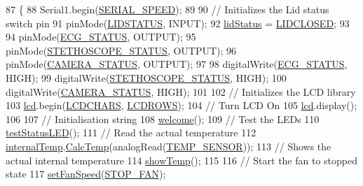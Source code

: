 \begin{DoxyCode}
87              \{
88   Serial1.begin(\hyperlink{_globals_8h_a4081bc1d938e0d9b2b0941e3a1143498}{SERIAL\_SPEED});
89 
90   \textcolor{comment}{// Initializes the Lid status switch pin}
91   pinMode(\hyperlink{_globals_8h_a9d1e04090b98f20c171c70e566a32e16}{LIDSTATUS}, INPUT);
92   \hyperlink{_meditech___chip_kit_control_panel_8pde_adea51712174a5f82a31231a67e0d4608}{lidStatus} = \hyperlink{_globals_8h_af04a3919dc1fa7d521c9514be995b43d}{LIDCLOSED};
93   
94   pinMode(\hyperlink{_globals_8h_a81c971d1ee27ca31e310c80ef260b390}{ECG\_STATUS}, OUTPUT);
95   pinMode(\hyperlink{_globals_8h_a8519a074bf27b6dcc876ce549b2f5ea7}{STETHOSCOPE\_STATUS}, OUTPUT);
96   pinMode(\hyperlink{_globals_8h_ad0154ccab9906702a495f07dfedd0136}{CAMERA\_STATUS}, OUTPUT);
97 
98   digitalWrite(\hyperlink{_globals_8h_a81c971d1ee27ca31e310c80ef260b390}{ECG\_STATUS}, HIGH);
99   digitalWrite(\hyperlink{_globals_8h_a8519a074bf27b6dcc876ce549b2f5ea7}{STETHOSCOPE\_STATUS}, HIGH);
100   digitalWrite(\hyperlink{_globals_8h_ad0154ccab9906702a495f07dfedd0136}{CAMERA\_STATUS}, HIGH);
101 
102   \textcolor{comment}{// Initializes the LCD library}
103   \hyperlink{_meditech___chip_kit_control_panel_8pde_ae0b100905fb0ed88dddaafda0aa05379}{lcd}.begin(\hyperlink{_l_c_d_8h_acea744bc7db589514d98dde1a19a4be6}{LCDCHARS}, \hyperlink{_l_c_d_8h_a1b8861bc5ab0412d754e0bd902c73bcf}{LCDROWS});
104   \textcolor{comment}{// Turn LCD On}
105   \hyperlink{_meditech___chip_kit_control_panel_8pde_ae0b100905fb0ed88dddaafda0aa05379}{lcd}.display();
106 
107   \textcolor{comment}{// Initialisation string}
108   \hyperlink{_meditech___chip_kit_control_panel_8pde_a236e454e493fc9b262f746305660a2eb}{welcome}();
109   \textcolor{comment}{// Test the LEDs}
110   \hyperlink{_meditech___chip_kit_control_panel_8pde_af1a6bbf84a5ea76623bdc49aaf642a28}{testStatusLED}();
111   \textcolor{comment}{// Read the actual temperature}
112   \hyperlink{_meditech___chip_kit_control_panel_8pde_adcfca3504612462229db71750def77f9}{internalTemp}.\hyperlink{class_temperature_a909c328fd6235d0e7c8ea110a1fb201d}{CalcTemp}(analogRead(\hyperlink{_temperature_8h_a16433c75f0d3615fe60d59ec8a86834a}{TEMP\_SENSOR}));
113   \textcolor{comment}{// Shows the actual internal temperature}
114   \hyperlink{_meditech___chip_kit_control_panel_8pde_a89c0a8283a410b693ebef39173a8f493}{showTemp}();
115   
116   \textcolor{comment}{// Start the fan to stopped state}
117   \hyperlink{_meditech___chip_kit_control_panel_8pde_ac0f1975168c58bd48fc29f8e3004a5a8}{setFanSpeed}(\hyperlink{_globals_8h_a1c75f833b458a1118ffc6e8ff1086bd8}{STOP\_FAN});

\end{DoxyCode}
